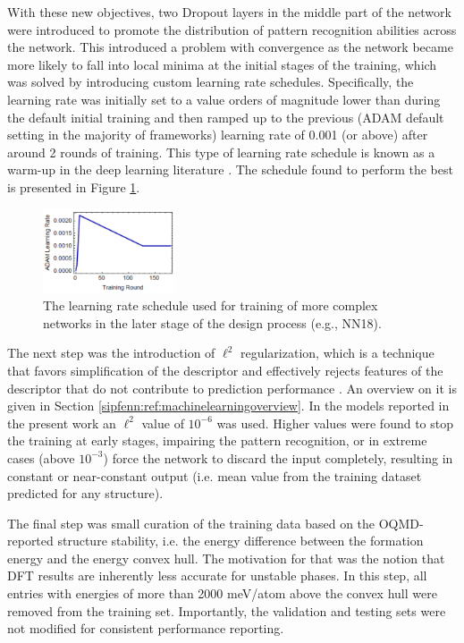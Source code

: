 With these new objectives, two Dropout layers in the middle part of the network were introduced to promote the distribution of pattern recognition abilities across the network. \cite{Srivastava2014Dropout:Overfitting} This introduced a problem with convergence as the network became more likely to fall into local minima at the initial stages of the training, which was solved by introducing custom learning rate schedules. Specifically, the learning rate was initially set to a value orders of magnitude lower than during the default initial training and then ramped up to the previous (ADAM default setting in the majority of frameworks) learning rate of 0.001 (or above) after around 2 rounds of training. This type of learning rate schedule is known as a warm-up in the deep learning literature \cite{gotmare2018closer}. The schedule found to perform the best is presented in Figure \ref{sipfenn:fig:learningrate}.

\begin{figure}[H]
\centering
    \includegraphics[width=0.35\textwidth]{sipfenn/nn18_learningrate_linonly.png}
    \caption{The learning rate schedule used for training of more complex networks in the later stage of the design process (e.g., NN18).}
    \label{sipfenn:fig:learningrate}
\end{figure}


The next step was the introduction of $\ell^2$ regularization, which is a technique that favors simplification of the descriptor and effectively rejects features of the descriptor that do not contribute to prediction performance \cite{L2Regularization}. An overview on it is given in Section \ref{sipfenn:ref:machinelearningoverview}. In the models reported in the present work an $\ell^2$ value of $10^{-6}$ was used. Higher values were found to stop the training at early stages, impairing the pattern recognition, or in extreme cases (above $10^{-3}$) force the network to discard the input completely, resulting in constant or near-constant output (i.e. mean value from the training dataset predicted for any structure).

The final step was small curation of the training data based on the OQMD-reported structure stability, i.e. the energy difference between the formation energy and the energy convex hull. The motivation for that was the notion that DFT results are inherently less accurate for unstable phases. In this step, all entries with energies of more than 2000 meV/atom above the convex hull were removed from the training set. Importantly, the validation and testing sets were not modified for consistent performance reporting.

